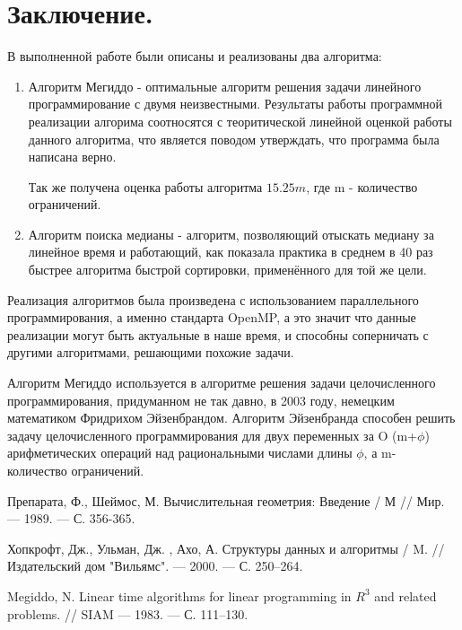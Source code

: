 \documentclass[12pt,a4paper]{article}
\begin{document}
\section{Заключение.}
В выполненной работе были описаны и реализованы два алгоритма:
\begin{enumerate}
\item Алгоритм Мегиддо - оптимальные алгоритм решения задачи линейного программирование с двумя неизвестными. Результаты работы программной реализации алгорима соотносятся с теоритической линейной оценкой работы данного алгоритма, что является поводом утверждать, что программа была написана верно.\par
Так же получена оценка работы алгоритма $15.25m$, где m - количество ограничений.
\item Алгоритм поиска медианы - алгоритм, позволяющий отыскать медиану за линейное время и работающий, как показала практика в среднем в 40 раз быстрее алгоритма быстрой сортировки, применённого для той же цели.
\end{enumerate}
Реализация алгоритмов была произведена с использованием параллельного программирования, а именно стандарта OpenMP, а это значит что данные реализации могут быть актуальные в наше время, и способны соперничать с другими алгоритмами, решающими похожие задачи.\par
Алгоритм Мегиддо используется в алгоритме решения задачи целочисленного программирования, придуманном не так давно, в 2003 году, немецким математиком  Фридрихом Эйзенбрандом. Алгоритм Эйзенбранда способен решить задачу целочисленного программирования для двух переменных за O (m+$\phi$) арифметических операций над рациональными числами длины $\phi$, а m- количество ограничений.\par
\newpage

\begin{thebibliography}{99}
%
 Препарата, Ф., Шеймос, М. Вычислительная геометрия: Введение /  М // Мир. --- 1989. --- С. 356-365.


 Хопкрофт, Дж., Ульман, Дж. , Ахо, А. Структуры данных и алгоритмы  / M. // Издательский дом "Вильямс". --- 2000. --- С. 250--264.

 Megiddo, N. Linear time algorithms for linear programming in $R^{3}$ and related problems. // SIAM --- 1983. --- С. 111--130. 

\end{thebibliography}
\newpage
\appendix
\end{document}
